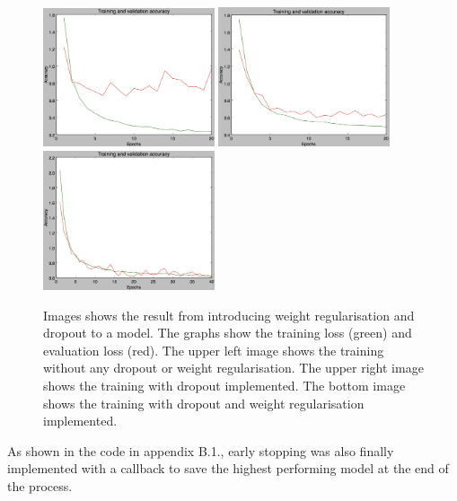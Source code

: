\begin{figure}[!hbtp]
\begin{center}
\includegraphics[width = 0.45\textwidth]{./Images/imageclassification1}
\includegraphics[width = 0.45\textwidth]{./Images/imageclassification2}
\includegraphics[width = 0.45\textwidth]{./Images/imageclassification3}
\caption{Images shows the result from introducing weight regularisation and dropout to a model. The graphs show the training loss (green) and evaluation loss (red). The upper left image shows the training without any dropout or weight regularisation. The upper right image shows the training with dropout implemented. The bottom image shows the training with dropout and weight regularisation implemented.}
\label{fig:imageclassification}
\end{center}
\end{figure}

As shown in the code in appendix B.1., early stopping was also finally implemented with a callback to save the
highest performing model at the end of the process.

